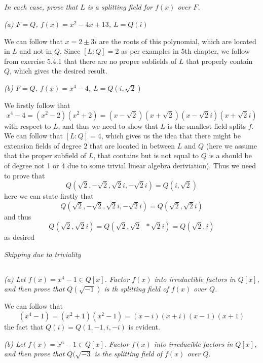 \documentclass[11pt,oneside,titlepage]{book}
\DeclareMathOperator \inv {^{-1}}
\begin{document}
\subsection{}

\textit{In each case, prove that $L$ is a splitting field for $f(x)$ over $F$.}

\textit{(a) $F = Q$, $f(x) = x^2 - 4x + 13$, $L = Q(i)$}

We can follow that $x = 2 \pm 3i$ are the roots of this polynomial,
which are located in $L$ and not in $Q$. Since $[L:Q] = 2$ as per
examples in 5th chapter, we follow from exercise 5.4.1 that there are
no proper subfields of $L$ that properly contain $Q$, which gives the
desired result.

\textit{(b) $F = Q$, $f(x) = x^4 - 4$, $L = Q(i, \sqrt{2})$}

We firstly follow that
$$x^4 - 4 = (x^2 - 2)(x^2 + 2) =
(x - \sqrt{2})(x + \sqrt{2})(x - \sqrt{2}i)(x + \sqrt{2}i)$$ with
respect to $L$, and thus we need to show that $L$ is the smallest
field splits $f$. We can follow that $[L:Q] = 4$, which gives us the
idea that there might be extension fields of degree $2$ that are
located in between $L$ and $Q$ (here we assume that the proper
subfield of $L$, that contains but is not equal to $Q$ is a should be
of degree not 1 or 4 due to some trivial linear algebra deriviation).
Thus we need to prove that
$$Q(\sqrt{2}, -\sqrt{2}, \sqrt{2}i, -\sqrt{2}i) = Q(i, \sqrt{2})$$
here we can state firstly that
$$Q(\sqrt{2}, -\sqrt{2}, \sqrt{2}i, -\sqrt{2}i) = Q(\sqrt{2}, \sqrt{2} i)$$
and thus
$$  Q(\sqrt{2}, \sqrt{2} i) =  Q(\sqrt{2}, \sqrt{2} \inv * \sqrt{2} i) = Q(\sqrt{2}, i)$$
as desired

\textit{Skipping due to triviality}

\subsection{}

\textit{(a) Let $f(x) = x^4 - 1 \in Q[x]$. Factor $f(x)$ into irreductible factors in $Q[x]$,
  and then prove that $Q(\sqrt{-1})$ is th splitting field of $f(x)$ over $Q$.}

We can follow that
$$(x^4 - 1) = (x^2 + 1)(x^2 - 1) = (x - i)(x + i)(x - 1)(x + 1)$$
the fact that $Q(i) = Q(1, -1, i, -i)$ is evident.

\textit{(b) Let $f(x) = x^6 - 1 \in Q[x]$. Factor $f(x)$ into
  irreducible factors in $Q[x]$, and then prove that $Q(\sqrt{-3}$ is
  the splitting field of $f(x)$ over $Q$.}
\end{document}
